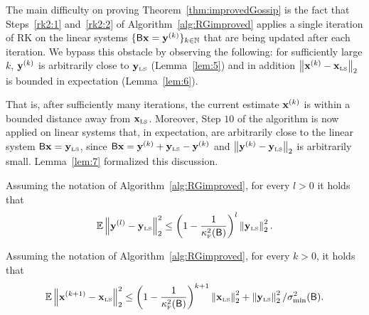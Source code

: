 The main difficulty on proving Theorem~\ref{thm:improvedGossip} is the fact that Steps~\ref{rk2:1} and~\ref{rk2:2} of Algorithm~\ref{alg:RGimproved} applies a single iteration of RK on the linear systems $\{{\mathsf{B} } \mathbf{x} = \mathbf{y}^{(k)}\}_{k\in \mathbb{N}}$ that are being updated after each iteration. We bypass this obstacle by observing the following: for sufficiently large $k$, $\mathbf{y}^{(k)}$ is arbitrarily close to $\mathbf{y}_{\textrm{\tiny LS}}$ (Lemma~\ref{lem:5}) and in addition $\left\|\mathbf{x}^{(k)} - \mathbf{x}_{\textrm{\tiny LS}} \right\|_2$ is bounded in expectation (Lemma~\ref{lem:6}).
%

%
That is, after sufficiently many iterations, the current estimate $\mathbf{x}^{(k)}$ is within a bounded distance away from $\mathbf{x}_{\textrm{\tiny LS}}$. Moreover, Step $10$ of the algorithm is now applied on linear systems that, in expectation, are arbitrarily close to the linear system ${\mathsf{B} } \mathbf{x} = \mathbf{y}_{\textrm{\tiny LS}}$, since ${\mathsf{B} } \mathbf{x} = \mathbf{y}^{(k)} + \mathbf{y}_{\textrm{\tiny LS}} - \mathbf{y}^{(k)}$ and $\left\|\mathbf{y}^{(k)} - \mathbf{y}_{\textrm{\tiny LS}}\right\|_2$ is arbitrarily small. Lemma~\ref{lem:7} formalized this discussion.
\begin{lemma}\label{lem:5}
Assuming the notation of Algorithm~\ref{alg:RGimproved}, for every $l>0$ it holds that
\begin{equation}\label{ineq:stopTime2}
	\operatorname{\mathbb{E}} \left\|\mathbf{y}^{(l)} - \mathbf{y}_{\textrm{\tiny LS}}\right\|_2^2 \leq  \left(1- \frac1{\kappa^2_{\textrm{\tiny F}}({\mathsf{B} })}\right)^{ l} \left\|\mathbf{y}_{\textrm{\tiny LS}}\right\|_2^2.
\end{equation}
\end{lemma}
\begin{lemma}\label{lem:6}
Assuming the notation of Algorithm~\ref{alg:RGimproved}, for every $k>0$, it holds that
\[\operatorname{\mathbb{E}} \left\|\mathbf{x}^{(k + 1)} - \mathbf{x}_{\textrm{\tiny LS}}\right\|_2^2 \leq \left(1- \frac1{\kappa^2_{\textrm{\tiny F}}({\mathsf{B} })}\right)^{k+1}\left\|\mathbf{x}_{\textrm{\tiny LS}}\right\|_2^2 + \left\|\mathbf{y}_{\textrm{\tiny LS}}\right\|_2^2 / \sigma_{\min}^2({\mathsf{B} }).\]
\end{lemma}


